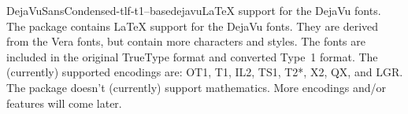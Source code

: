 \documentclass{ddltxtyp}
\begin{document}
\begin{package}{DejaVuSansCondensed-tlf-t1--base}{dejavu}{{\LaTeX} support for the DejaVu fonts.}
The package contains {\LaTeX} support for the DejaVu fonts. They
are derived from the Vera fonts, but contain more characters
and styles. The fonts are included in the original TrueType
format and converted Type~1 format. The (currently) supported
encodings are: OT1, T1, IL2, TS1, T2*, X2, QX, and LGR. The
package doesn't (currently) support mathematics. More encodings
and/or features will come later.
\end{package}



\end{document}
